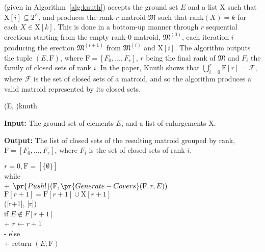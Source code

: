  (given in Algorithm~\ref{alg:knuth}) accepts the ground set $E$ and a list $\mathrm{X}$ such that $\mathrm{X}[i] \subseteq 2^E$, and produces the rank-$r$ matroid $\mathfrak{M}$ such that $\mbox{rank}(X) = k$ for each $X \in \mathrm{X}[k]$. This is done in a bottom-up manner through $r$ sequential erections starting from the empty rank-0 matroid, $\mathfrak{M}^{(0)}$, each iteration $i$ producing the erection $\mathfrak{M}^{(i+1)}$ from $\mathfrak{M}^{(i)}$ and $\mathrm{X}[i]$. The algorithm outputs the tuple $(E, \mathrm{F})$, where $\mathrm{F} = [F_0, \ldots, F_r]$, $r$ being the final rank of $\mathfrak{M}$ and $F_i$ the family of closed sets of rank $i$. In the paper, Knuth shows that $\bigcup_{i=0}^r \mathrm{F}[r] = \mathcal{F}$, where $\mathcal{F}$ is the set of closed sets of a matroid, and so the algorithm produces a valid matroid represented by its closed sets.

\begin{algorithm}[float*=ht!]{(E, )}{knuth}

  \textbf{Input:}     \tab The ground set of elements $E$, and a list of enlargements $\mathrm{X}$.

  \textbf{Output:}    \tab The list of closed sets of the resulting matroid grouped by rank, \\
  \mbox{}\tab $\mathrm{F} = [F_0, \ldots, F_r]$, where $F_i$ is the set of closed sets of rank $i$.

  \begin{pseudo}[kw, label=\small\arabic*, indent-mark, line-height=1.2]
    $r = 0, \mathrm{F} = [\{ \emptyset \}]$ \\
    while   \\+
    $\pr{Push!}(\mathrm{F}, \pr{Generate-Covers}(\mathrm{F}, r, E))$ \\
    $\mathrm{F}[r+1] = \mathrm{F}[r+1] \cup \mathrm{X}[r+1]$ \\
    ([r+1], [r]) \\

    if $E \not \in F[r+1]$ \\+
    $r \leftarrow r+1$ \\-
    else \\+
    return $(E, \mathrm{F})$

  \end{pseudo}

\end{algorithm}

